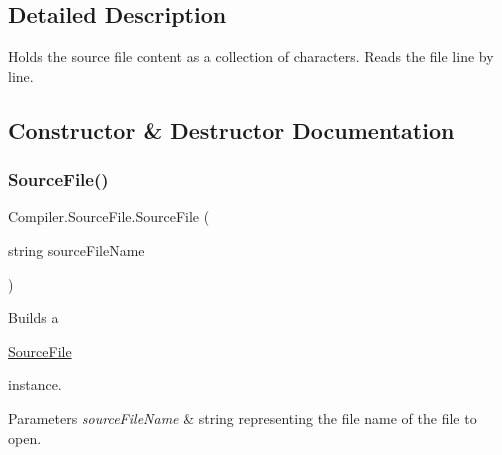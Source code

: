 \subsection{Detailed Description}
Holds the source file content as a collection of characters. Reads the file line by line. 

\subsection{Constructor \& Destructor Documentation}
\mbox{\label{class_compiler_1_1_source_file_aba8bb7d1c0418d2b0c6033308209265a}} 
\subsubsection{\texorpdfstring{Source\+File()}{SourceFile()}}
{\footnotesize\ttfamily Compiler.\+Source\+File.\+Source\+File (\begin{DoxyParamCaption}\item[{string}]{source\+File\+Name }\end{DoxyParamCaption})}

Builds a
\begin{DoxyCode}
\mbox{\hyperlink{class_compiler_1_1_source_file_aba8bb7d1c0418d2b0c6033308209265a}{SourceFile}} 
\end{DoxyCode}
 instance. 
\begin{DoxyParams}{Parameters}
{\em source\+File\+Name} & string representing the file name of the file to open. \\
\hline
\end{DoxyParams}

